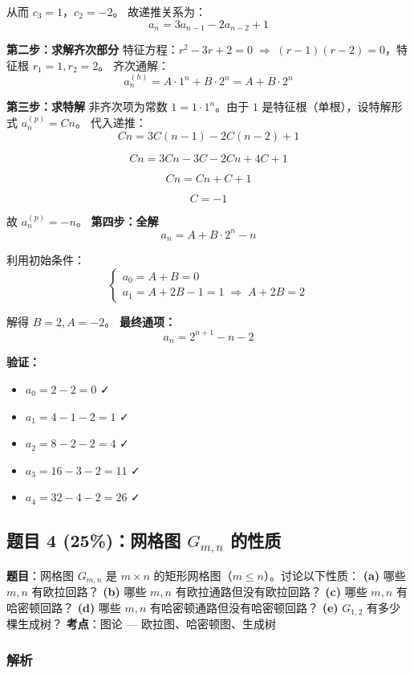 \documentclass[10pt,a4paper,openany]{ctexbook}
\theoremstyle{definition}
\theoremstyle{remark}
\begin{document}
从而 $c_3 = 1$，$c_2 = -2$。
故递推关系为：
\[
 a_n = 3a_{n-1} - 2a_{n-2} + 1 
\]

\textbf{第二步：求解齐次部分}
特征方程：$r^2 - 3r + 2 = 0 \;\Rightarrow\; (r-1)(r-2) = 0$，特征根 $r_1 = 1, r_2 = 2$。
齐次通解：
\[
 a_n^{(h)} = A \cdot 1^n + B \cdot 2^n = A + B \cdot 2^n 
\]

\textbf{第三步：求特解}
非齐次项为常数 $1 = 1 \cdot 1^n$。由于 $1$ 是特征根（单根），设特解形式 $a_n^{(p)} = Cn$。
代入递推：
\[
 Cn = 3C(n-1) - 2C(n-2) + 1 
\]

\[
 Cn = 3Cn - 3C - 2Cn + 4C + 1 
\]

\[
 Cn = Cn + C + 1 
\]

\[
 C = -1 
\]

故 $a_n^{(p)} = -n$。
\textbf{第四步：全解}
\[
 a_n = A + B \cdot 2^n - n 
\]

利用初始条件：
\[
\begin{cases}
a_0 = A + B = 0 \\
a_1 = A + 2B - 1 = 1 \;\Rightarrow\; A + 2B = 2
\end{cases}
\]

解得 $B = 2, A = -2$。
\textbf{最终通项：}
\[
 \boxed{a_n = 2^{n+1} - n - 2} 
\]

\textbf{验证：}
\begin{itemize}
\item $a_0 = 2 - 2 = 0$ ✓
\item $a_1 = 4 - 1 - 2 = 1$ ✓
\item $a_2 = 8 - 2 - 2 = 4$ ✓
\item $a_3 = 16 - 3 - 2 = 11$ ✓
\item $a_4 = 32 - 4 - 2 = 26$ ✓

\end{itemize}

\vspace{-2pt}

\subsection{题目 4 (25\%)：网格图 $G_{m,n}$ 的性质}

\textbf{题目}：网格图 $G_{m,n}$ 是 $m \times n$ 的矩形网格图（$m \leq n$）。讨论以下性质：
\textbf{(a)} 哪些 $m,n$ 有欧拉回路？
\textbf{(b)} 哪些 $m,n$ 有欧拉通路但没有欧拉回路？
\textbf{(c)} 哪些 $m,n$ 有哈密顿回路？
\textbf{(d)} 哪些 $m,n$ 有哈密顿通路但没有哈密顿回路？
\textbf{(e)} $G_{1,2}$ 有多少棵生成树？
\textbf{考点}：图论 — 欧拉图、哈密顿图、生成树
\subsubsection{解析}
\end{document}
